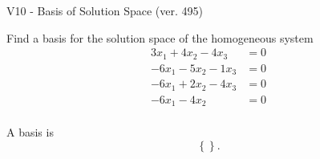 \begin{exercise}
  \begin{exerciseTitle}V10 - Basis of Solution Space (ver. 495)\end{exerciseTitle}
  \begin{exerciseStatement}
    Find a basis for the solution space of the homogeneous system 
\begin{align*}
 3 x_ 1 + 4 x_ 2 -4 x_ 3 &= 0  \\ 
  -6 x_ 1 -5 x_ 2 -1 x_ 3 &= 0  \\ 
  -6 x_ 1 + 2 x_ 2 -4 x_ 3 &= 0  \\ 
  -6 x_ 1 -4 x_ 2 &= 0  \\ 
 \end{align*}


 
  \end{exerciseStatement}

  \begin{exerciseAnswer}
   A basis is   
\[\left\{\right\}.\]

  


  \end{exerciseAnswer}
\end{exercise}